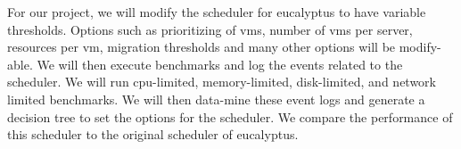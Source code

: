 For our project, we will modify the scheduler for eucalyptus to have variable thresholds.  Options such as prioritizing of vms, number of vms per server, resources per vm, migration thresholds and many other options will be modify-able.  We will then execute benchmarks and log the events related to the scheduler.  We will run cpu-limited, memory-limited, disk-limited, and network limited benchmarks.  We will then data-mine these event logs and generate a decision tree to set the options for the scheduler.  We compare the performance of this scheduler to the original scheduler of eucalyptus.